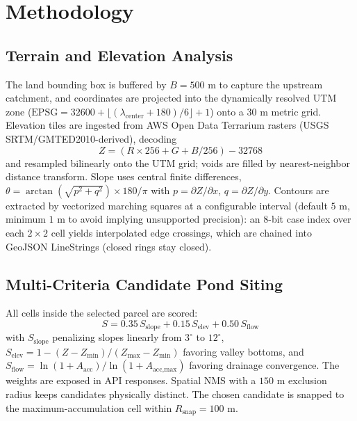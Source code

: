 \documentclass[manuscript,screen,review]{acmart}
\begin{document}
\section{Methodology}
\label{sec:methodology}

\subsection{Terrain and Elevation Analysis}
The land bounding box is buffered by $B = 500\text{ m}$ to capture the upstream catchment, and coordinates are projected into the dynamically resolved UTM zone ($\text{EPSG} = 32600 + \lfloor(\lambda_{\text{center}} + 180)/6\rfloor + 1$) onto a $30\text{ m}$ metric grid. Elevation tiles are ingested from AWS Open Data Terrarium rasters (USGS SRTM/GMTED2010-derived), decoding
\begin{equation}
    Z = (R \times 256 + G + B/256) - 32768
\end{equation}
and resampled bilinearly onto the UTM grid; voids are filled by nearest-neighbor distance transform. Slope uses central finite differences, $\theta = \arctan(\sqrt{p^2 + q^2}) \times 180/\pi$ with $p = \partial Z/\partial x$, $q = \partial Z/\partial y$. Contours are extracted by vectorized marching squares at a configurable interval (default $5\text{ m}$, minimum $1\text{ m}$ to avoid implying unsupported precision): an 8-bit case index over each $2\times2$ cell yields interpolated edge crossings, which are chained into GeoJSON LineStrings (closed rings stay closed).

\subsection{Multi-Criteria Candidate Pond Siting}
All cells inside the selected parcel are scored:
\begin{equation}
    S = 0.35\,S_{\text{slope}} + 0.15\,S_{\text{elev}} + 0.50\,S_{\text{flow}}
\end{equation}
with $S_{\text{slope}}$ penalizing slopes linearly from $3^\circ$ to $12^\circ$, $S_{\text{elev}} = 1 - (Z - Z_{\min})/(Z_{\max} - Z_{\min})$ favoring valley bottoms, and $S_{\text{flow}} = \ln(1 + A_{\text{acc}})/\ln(1 + A_{\text{acc,max}})$ favoring drainage convergence. The weights are exposed in API responses. Spatial NMS with a $150\text{ m}$ exclusion radius keeps candidates physically distinct. The chosen candidate is snapped to the maximum-accumulation cell within $R_{\text{snap}} = 100\text{ m}$.
\end{document}
